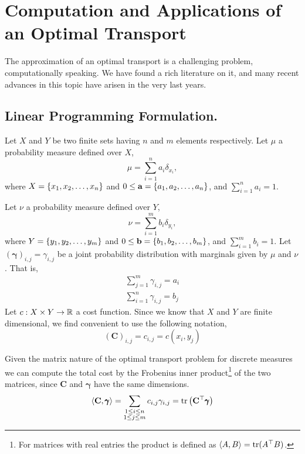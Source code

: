\chapter{Computation and Applications of an Optimal Transport}
The approximation of an optimal transport is a challenging problem, computationally speaking. We have found a rich literature on it, and many recent advances in this topic have arisen in the very last years. 
\section{Linear Programming Formulation.}
Let $X$ and $Y$ be two finite sets having $n$ and $m$ elements respectively. Let $\mu$ a probability measure defined over $X$,
\begin{equation}
	\mu=\sum_{i=1}^{n} a_i \delta_{x_i},
\end{equation} 
where $X=\left\lbrace x_1, x_2, \dots, x_n \right\rbrace$ and $0\leq\mathbf{a}=\left\lbrace a_1, a_2, \dots, a_n \right\rbrace$, and $\sum_{i=1}^{n}a_i=1$.

Let $\nu$ a probability measure defined over $Y$,
\begin{equation}
	\nu=\sum_{i=1}^{m} b_i \delta_{y_i},
\end{equation}
where $Y=\left\lbrace y_1, y_2, \dots, y_m \right\rbrace$ and $0\leq\mathbf{b}=\left\lbrace b_1, b_2, \dots, b_m \right\rbrace$, and $\sum_{i=1}^{m}b_i=1$. 
Let $(\pmb{\gamma})_{i,j}=\gamma_{i,j}$ be a joint probability distribution with marginals given by $\mu$ and $\nu$. That is,
\begin{align}
	\sum_{j=1}^{m}\gamma_{i,j}=a_i\\ \sum_{i=1}^{n}\gamma_{i,j}=b_j
\end{align}
Let $c:X\times Y \rightarrow \mathbb{R}$ a cost function. Since we know that $X$ and $Y$ are finite dimensional, we find convenient to use the following notation,
\begin{equation}
	(\mathbf C)_{i,j}=c_{i,j}=c(x_i, y_j)
\end{equation}

Given the matrix nature of the optimal transport problem for discrete measures we can compute the total cost by the Frobenius inner product\footnote{For matrices with real entries the product is defined as $\left\langle A, B \right\rangle=\mathrm{tr}(A^\top B)$.} of the two matrices, since $\mathbf{C}$ and $\pmb{\gamma}$ have the same dimensions.
\begin{equation}
	\left\langle \mathbf{C}, \pmb{\gamma} \right\rangle=\sum_{\substack{1\leq i \leq n \\ 1\leq j\leq m}}c_{i,j}\gamma_{i,j}=\mathrm{tr}\left( \mathbf{C}^\top\pmb{\gamma} \right)
\end{equation}

